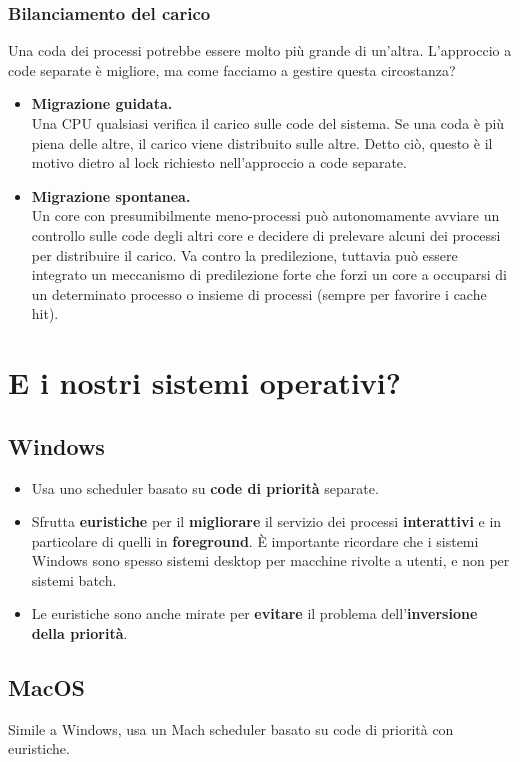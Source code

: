 \documentclass{report}
\begin{document}
\subsubsection{Bilanciamento del carico}
Una coda dei processi potrebbe essere molto più grande di un'altra. L'approccio a code separate è migliore, ma come facciamo a gestire questa circostanza? 
\begin{itemize}
    \item \textbf{Migrazione guidata.}\\
    Una CPU qualsiasi verifica il carico sulle code del sistema. Se una coda è più piena delle altre, il carico viene distribuito sulle altre. Detto ciò, questo è il motivo dietro al lock richiesto nell'approccio a code separate.

    \item \textbf{Migrazione spontanea.}\\
    Un core con presumibilmente meno-processi può autonomamente avviare un controllo sulle code degli altri core e decidere di prelevare alcuni dei processi per distribuire il carico. Va contro la predilezione, tuttavia può essere integrato un meccanismo di predilezione forte che forzi un core a occuparsi di un determinato processo o insieme di processi (sempre per favorire i cache hit).
\end{itemize}

\section{E i nostri sistemi operativi?}
\subsection{Windows}
\begin{itemize}
    \item Usa uno scheduler basato su \textbf{code di priorità} separate.
    \item Sfrutta \textbf{euristiche} per il \textbf{migliorare} il servizio dei processi \textbf{interattivi} e in particolare di quelli in \textbf{foreground}. È importante ricordare che i sistemi Windows sono spesso sistemi desktop per macchine rivolte a utenti, e non per sistemi batch.
    \item Le euristiche sono anche mirate per \textbf{evitare} il problema dell'\textbf{inversione della priorità}.
\end{itemize}

\subsection{MacOS}
Simile a Windows, usa un Mach scheduler basato su code di priorità con euristiche.
\end{document}
